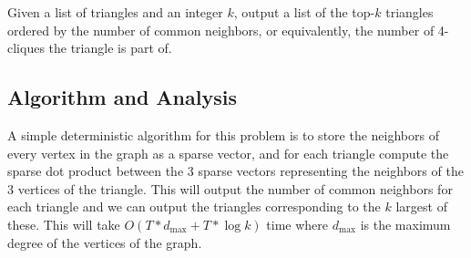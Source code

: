 \documentclass{article}
\begin{document}
Given a list of triangles and an integer $k$,
output a list of the top-$k$ triangles ordered
by the number of common  neighbors, or
equivalently, the number of 4-cliques the 
triangle is part of.  


\subsection{Algorithm and Analysis}

A simple deterministic algorithm for this 
problem is to store the neighbors of every
vertex in the graph as a sparse vector, and
for each triangle compute the sparse dot product
between the 3 sparse vectors representing the 
neighbors of the 3 vertices of the triangle.
This will output the number of common 
neighbors for each triangle and we can output
the triangles corresponding to the $k$ largest
of these. This will take $O(T * d_{\text{max}} + T * 
\log{k})$ time where $d_{\text{max}}$ is the maximum 
degree of the vertices of the graph.
\end{document}
